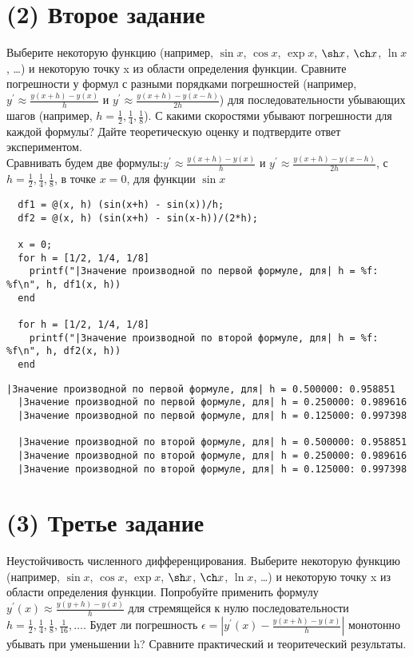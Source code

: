 \section{(2) Второе задание}
Выберите некоторую функцию (например, $\sin x$, $\cos x$, $\exp x$, $\sh x$, $\ch x$, $\ln x$, \ldots) и некоторую точку x из области определения функции. Сравните погрешности у формул с разными порядками погрешностей (например, $y^{'} \approx \frac{y(x+h) - y(x)}{h}$ и $y^{'} \approx \frac{y(x+h) - y(x-h)}{2h}$) для последовательности убывающих шагов (например, $h = \frac{1}{2}, \frac{1}{4}, \frac{1}{8}$). С какими скоростями убывают погрешности для каждой формулы? Дайте теоретическую оценку и подтвердите ответ экспериментом.\\[5mm]
Сравнивать будем две формулы:$y^{'} \approx \frac{y(x+h) - y(x)}{h}$ и $y^{'} \approx \frac{y(x+h) - y(x-h)}{2h}$, с $h = \frac{1}{2}, \frac{1}{4}, \frac{1}{8}$, в точке $x = 0$, для функции $\sin x$
\begin{lstlisting}
  df1 = @(x, h) (sin(x+h) - sin(x))/h;
  df2 = @(x, h) (sin(x+h) - sin(x-h))/(2*h);

  x = 0;
  for h = [1/2, 1/4, 1/8]
    printf("|Значение производной по первой формуле, для| h = %f: %f\n", h, df1(x, h))
  end

  for h = [1/2, 1/4, 1/8]
    printf("|Значение производной по второй формуле, для| h = %f: %f\n", h, df2(x, h))
  end
\end{lstlisting}
\begin{lstlisting}[backgroundcolor=\color{cyan}]
  |Значение производной по первой формуле, для| h = 0.500000: 0.958851
  |Значение производной по первой формуле, для| h = 0.250000: 0.989616
  |Значение производной по первой формуле, для| h = 0.125000: 0.997398

  |Значение производной по второй формуле, для| h = 0.500000: 0.958851
  |Значение производной по второй формуле, для| h = 0.250000: 0.989616
  |Значение производной по второй формуле, для| h = 0.125000: 0.997398
\end{lstlisting}


\section{(3) Третье задание}
Неустойчивость численного дифференцирования. Выберите некоторую функцию (например, $\sin x$, $\cos x$, $\exp x$, $\sh x$, $\ch x$, $\ln x$, \ldots) и некоторую точку x из области определения функции. Попробуйте применить формулу $y^{'}(x) \approx \frac{y(y+h) - y(x)}{h}$ для стремящейся к нулю последовательности $h = \frac{1}{2}, \frac{1}{4}, \frac{1}{8}, \frac{1}{16}, \ldots$. Будет ли погрешность $\epsilon = \left |y^{'}(x) - \frac{y(x+h) - y(x)}{h} \right |$ монотонно убывать при уменьшении h? Сравните практический и теоритеческий результаты.\\[5mm]

